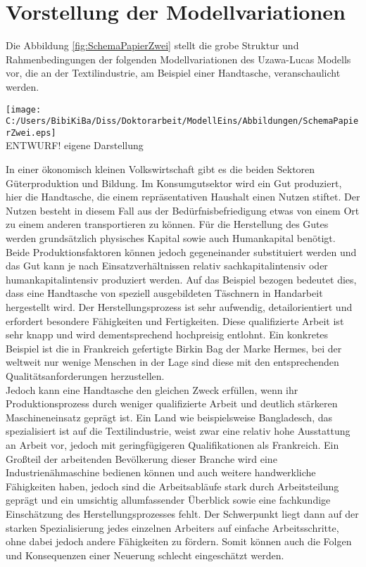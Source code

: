 \section[Vorstellung der Modellvariationen]{Vorstellung der Modellvariationen}
Die Abbildung \ref{fig:SchemaPapierZwei} stellt die grobe Struktur und Rahmenbedingungen der folgenden Modellvariationen des Uzawa-Lucas Modells vor, die an der Textilindustrie, am Beispiel einer Handtasche, veranschaulicht werden.\newline
\begin{figure*}[htbp]
\centering
	\texttt{[image: C:/Users/BibiKiBa/Diss/Doktorarbeit/ModellEins/Abbildungen/SchemaPapierZwei.eps]}
	\\
		\hfill\footnotesize{}  ENTWURF! eigene Darstellung
		\caption{Kategorisierung der Entwicklungsstufen}
		\label{fig:SchemaPapierZwei}		
\end{figure*}
In einer ökonomisch kleinen Volkswirtschaft gibt es die beiden Sektoren Güterproduktion und Bildung. Im Konsumgutsektor wird ein Gut produziert, hier die Handtasche, die einem repräsentativen Haushalt einen Nutzen stiftet. Der Nutzen besteht in diesem Fall aus der Bedürfnisbefriedigung etwas von einem Ort zu einem anderen transportieren zu können. Für die Herstellung des Gutes werden grundsätzlich physisches Kapital sowie auch Humankapital benötigt. Beide Produktionsfaktoren können jedoch gegeneinander substituiert werden und das Gut kann je nach Einsatzverhältnissen relativ sachkapitalintensiv oder humankapitalintensiv produziert werden. Auf das Beispiel bezogen bedeutet dies, dass eine Handtasche von speziell ausgebildeten Täschnern in Handarbeit hergestellt wird. Der Herstellungsprozess ist sehr aufwendig, detailorientiert und erfordert besondere Fähigkeiten und Fertigkeiten. Diese qualifizierte Arbeit ist sehr knapp und wird dementsprechend hochpreisig entlohnt. Ein konkretes Beispiel ist die in Frankreich gefertigte Birkin Bag der Marke Hermes, bei der weltweit nur wenige Menschen in der Lage sind diese mit den entsprechenden Qualitätsanforderungen herzustellen.\\
Jedoch kann eine Handtasche den gleichen Zweck erfüllen, wenn ihr Produktionsprozess durch weniger qualifizierte Arbeit und deutlich stärkeren Maschineneinsatz geprägt ist.
Ein Land wie beispielsweise Bangladesch, das spezialisiert ist auf die Textilindustrie, weist zwar eine relativ hohe Ausstattung an Arbeit vor, jedoch mit geringfügigeren Qualifikationen als Frankreich. Ein Gro{\ss}teil der arbeitenden Bevölkerung dieser Branche wird eine Industrienähmaschine bedienen können und auch weitere handwerkliche Fähigkeiten haben, jedoch sind die Arbeitsabläufe stark durch Arbeitsteilung geprägt und ein umsichtig allumfassender Überblick sowie eine fachkundige Einschätzung des Herstellungsprozesses fehlt. Der Schwerpunkt liegt dann auf der starken Spezialisierung jedes einzelnen Arbeiters auf einfache Arbeitsschritte, ohne dabei jedoch andere Fähigkeiten zu fördern. Somit können auch die Folgen und Konsequenzen einer Neuerung schlecht eingeschätzt werden. 
